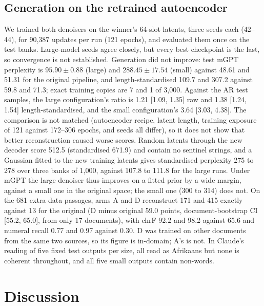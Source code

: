 \documentclass[11pt,a4paper]{article}
\begin{document}
\subsection{Generation on the retrained autoencoder}
\label{sec:res-newgen}
We trained both denoisers on the winner's 64-slot latents, three seeds each (42--44), for 90,387 updates per run (121 epochs), and evaluated them once on the test banks. Large-model seeds agree closely, but every best checkpoint is the last, so convergence is not established. Generation did not improve: test mGPT perplexity is $95.90\pm0.88$ (large) and $288.45\pm17.54$ (small) against 48.61 and 51.31 for the original pipeline, and length-standardised 109.7 and 307.2 against 59.8 and 71.3; exact training copies are 7 and 1 of 3,000. Against the AR test samples, the large configuration's ratio is 1.21 [1.09, 1.35] raw and 1.38 [1.24, 1.54] length-standardised, and the small configuration's 3.64 [3.03, 4.38]. The comparison is not matched (autoencoder recipe, latent length, training exposure of 121 against 172--306 epochs, and seeds all differ), so it does not show that better reconstruction caused worse scores. Random latents through the new decoder score 512.5 (standardised 671.9) and contain no sentinel strings, and a Gaussian fitted to the new training latents gives standardised perplexity 275 to 278 over three banks of 1,000, against 107.8 to 111.8 for the large runs. Under mGPT the large denoiser thus improves on a fitted prior by a wide margin, against a small one in the original space; the small one (300 to 314) does not. On the 681 extra-data passages, arms A and D reconstruct 171 and 415 exactly against 13 for the original (D minus original 59.0 points, document-bootstrap CI [55.2, 65.0], from only 17 documents), with chrF 92.2 and 98.2 against 65.6 and numeral recall 0.77 and 0.97 against 0.30. D was trained on other documents from the same two sources, so its figure is in-domain; A's is not. In Claude's reading of five fixed test outputs per size, all read as Afrikaans but none is coherent throughout, and all five small outputs contain non-words.

\section{Discussion}
\label{sec:discussion}
\end{document}
